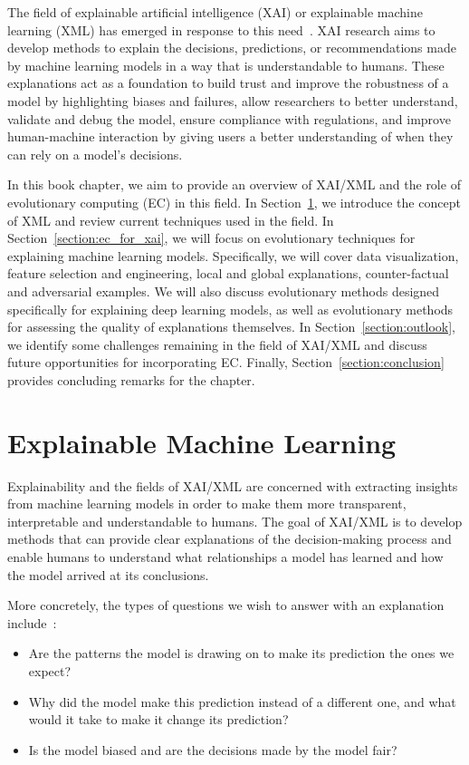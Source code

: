\documentclass[graybox]{svmult}
\begin{document}
The field of explainable artificial intelligence (XAI) or explainable machine learning (XML)  
has emerged in response to this need~\cite{iML_Murdoch_PNAS_19}. 
XAI research aims to develop methods to explain the decisions, predictions, 
or recommendations made by machine learning models in a way that is understandable to humans. 
These explanations act as a foundation to build trust and improve the robustness of a model 
by highlighting biases and failures, 
allow researchers to better understand, validate and debug the model, 
ensure compliance with regulations, 
and improve human-machine interaction by giving users a better understanding of 
when they can rely on a model's decisions.

In this book chapter, 
we aim to provide an overview of XAI/XML 
and the role of evolutionary computing (EC) in this field. 
In Section~\ref{section:xai}, 
we introduce the concept of XML and review current techniques used in the field. 
In Section~\ref{section:ec_for_xai}, 
we will focus on evolutionary techniques for explaining machine learning models. 
Specifically, we will cover data visualization, feature selection and engineering, 
local and global explanations, counter-factual and adversarial examples. 
We will also discuss evolutionary methods designed specifically for explaining deep learning models, 
as well as evolutionary methods for assessing the quality of explanations themselves. 
In Section~\ref{section:outlook}, 
we identify some challenges remaining in the field of XAI/XML 
and discuss future opportunities for incorporating EC. 
Finally, Section~\ref{section:conclusion} provides concluding remarks for the chapter.


\section{Explainable Machine Learning}
\label{section:xai}

Explainability and the fields of XAI/XML are concerned with 
extracting insights from machine learning models in order to 
make them more transparent, interpretable and understandable to humans. 
The goal of XAI/XML is to develop methods that 
can provide clear explanations of the decision-making process and enable humans to understand 
what relationships a model has learned and how the model arrived at its conclusions.

More concretely, the types of questions we wish to answer with an explanation 
include~\cite{bacarditIntersectionEvolutionaryComputation2022a}:
\begin{itemize}
\item Are the patterns the model is drawing on to make its prediction the ones we expect?
\item Why did the model make this prediction instead of a different one, 
and what would it take to make it change its prediction?
\item Is the model biased and are the decisions made by the model fair?
\end{itemize}
\end{document}
